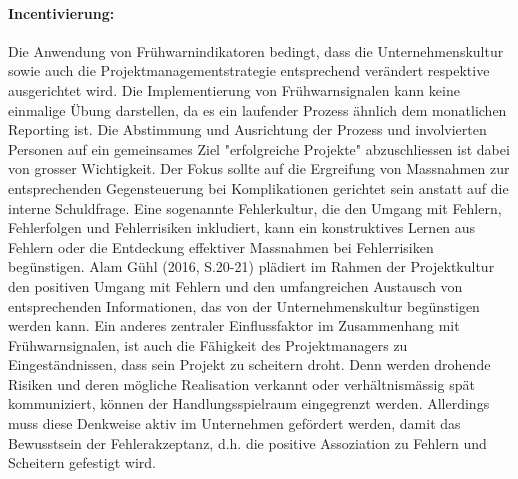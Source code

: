 \paragraph{Incentivierung:} Die Anwendung von Frühwarnindikatoren bedingt, dass die Unternehmenskultur sowie auch die Projektmanagementstrategie entsprechend verändert respektive ausgerichtet wird. Die Implementierung von Frühwarnsignalen kann keine einmalige Übung darstellen, da es ein laufender Prozess ähnlich dem monatlichen Reporting ist. Die Abstimmung und Ausrichtung der Prozess und involvierten Personen auf ein gemeinsames Ziel "erfolgreiche Projekte" abzuschliessen ist dabei von grosser Wichtigkeit. Der Fokus sollte auf die Ergreifung von Massnahmen zur entsprechenden Gegensteuerung bei Komplikationen gerichtet sein anstatt auf die interne Schuldfrage. Eine sogenannte Fehlerkultur, die den Umgang mit Fehlern, Fehlerfolgen und Fehlerrisiken inkludiert, kann ein konstruktives Lernen aus Fehlern oder die Entdeckung effektiver Massnahmen bei Fehlerrisiken begünstigen. Alam Gühl (2016, S.20-21) plädiert im Rahmen der Projektkultur den positiven Umgang mit Fehlern und  den umfangreichen Austausch von entsprechenden Informationen, das von der Unternehmenskultur begünstigen werden kann. Ein anderes zentraler Einflussfaktor im Zusammenhang mit Frühwarnsignalen, ist auch die Fähigkeit des Projektmanagers zu Eingeständnissen, dass sein Projekt zu scheitern droht. Denn werden drohende Risiken und deren mögliche Realisation verkannt oder verhältnismässig spät kommuniziert, können der Handlungsspielraum eingegrenzt werden. Allerdings muss diese Denkweise aktiv im Unternehmen gefördert werden, damit das Bewusstsein der Fehlerakzeptanz, d.h. die positive Assoziation zu Fehlern und Scheitern gefestigt wird. 


